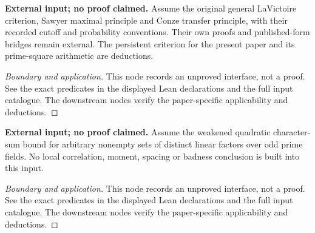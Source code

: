 \begin{lemma}
\label{input_badness}
\uses{}
\textbf{External input; no proof claimed.} Assume the original general LaVictoire criterion, Sawyer maximal principle and Conze transfer principle, with their recorded cutoff and probability conventions. Their own proofs and published-form bridges remain external. The persistent criterion for the present paper and its prime-square arithmetic are deductions.
\end{lemma}
\begin{proof}[Boundary and application]
\uses{}
This node records an unproved interface, not a proof. See the exact predicates in the displayed Lean declarations and the full input catalogue. The downstream nodes verify the paper-specific applicability and deductions.
\end{proof}

\begin{lemma}
\label{input_weil}
\uses{}
\textbf{External input; no proof claimed.} Assume the weakened quadratic character-sum bound for arbitrary nonempty sets of distinct linear factors over odd prime fields. No local correlation, moment, spacing or badness conclusion is built into this input.
\end{lemma}
\begin{proof}[Boundary and application]
\uses{}
This node records an unproved interface, not a proof. See the exact predicates in the displayed Lean declarations and the full input catalogue. The downstream nodes verify the paper-specific applicability and deductions.
\end{proof}

